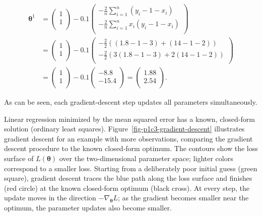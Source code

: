 \documentclass[
  letterpaper,
  krantz2]{style/krantz}
\begin{document}
\[
\begin{aligned}
\boldsymbol{\theta}^1 &= 
\begin{pmatrix}
1 \\
1 \\
\end{pmatrix} - 0.1
\begin{pmatrix}
-\frac{2}{n}\sum_{i=1}^n (y_i - 1 - x_i) \\
-\frac{2}{n}\sum_{i=1}^n x_i (y_i - 1 - x_i) \\
\end{pmatrix} \\
&=
\begin{pmatrix}
1 \\
1 \\
\end{pmatrix} - 0.1
\begin{pmatrix}
-\frac{2}{2}((1.8 - 1 - 3) + (14 - 1 - 2)) \\
-\frac{2}{2}(3(1.8 - 1 - 3) + 2(14 - 1 - 2)) \\
\end{pmatrix} \\
&=
\begin{pmatrix}
1 \\
1 \\
\end{pmatrix} - 0.1
\begin{pmatrix}
-8.8 \\
-15.4 \\
\end{pmatrix} =
\begin{pmatrix}
1.88 \\
2.54 \\
\end{pmatrix}.
\end{aligned}
\]

As can be seen, each gradient-descent step updates all parameters
simultaneously.

Linear regression minimized by the mean squared error has a known,
closed-form solution (ordinary least squares).
Figure~\ref{fig-p1c3-gradient-descent} illustrates gradient descent for
an example with more observations, comparing the gradient descent
procedure to the known closed-form optimum. The contours show the loss
surface of \(L(\boldsymbol{\theta})\) over the two-dimensional parameter
space; lighter colors correspond to a smaller loss. Starting from a
deliberately poor initial guess (green square), gradient descent traces
the blue path along the loss surface and finishes (red circle) at the
known closed-form optimum (black cross). At every step, the update moves
in the direction \(-\nabla_{\boldsymbol{\theta}} L\); as the gradient
becomes smaller near the optimum, the parameter updates also become
smaller.
\end{document}
